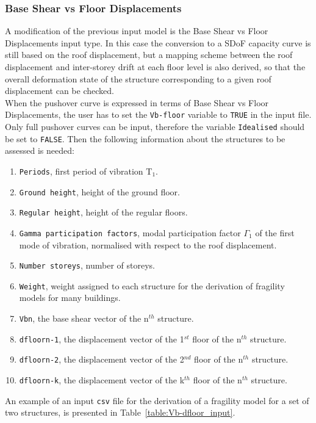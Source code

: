 \subsubsection{Base Shear vs Floor Displacements}
\label{subsubsec:VB-Dfloor}
A modification of the previous input model is the Base Shear vs Floor Displacements input type. In this case the conversion to a SDoF capacity curve is still based on the roof displacement, but a mapping scheme between the roof displacement and inter-storey drift at each floor level is also derived, so that the overall deformation state of the structure corresponding to a given roof displacement can be checked.\\
When the pushover curve is expressed in terms of Base Shear vs Floor Displacements, the user has to set the \verb=Vb-floor= variable to \verb=TRUE= in the input file. Only full pushover curves can be input, therefore the variable \verb=Idealised= should be set to \verb=FALSE=. Then the following information about the structures to be assessed is needed:\\

\begin{enumerate}
\item \verb=Periods=, first period of vibration T$_1$.
\item \verb=Ground height=, height of the ground floor.
\item \verb=Regular height=, height of the regular floors.
\item \verb=Gamma participation factors=, modal participation factor $\Gamma_1$ of the first mode of vibration, normalised with respect to the roof displacement.
\item \verb=Number storeys=, number of storeys.
\item \verb=Weight=, weight assigned to each structure for the derivation of fragility models for many buildings.
\item \verb=Vbn=, the base shear vector of the n$^{th}$ structure.
\item \verb=dfloorn-1=, the displacement vector of the 1$^{st}$ floor of the n$^{th}$ structure.
\item \verb=dfloorn-2=, the displacement vector of the 2$^{nd}$ floor of the n$^{th}$ structure.
\item \verb=dfloorn-k=, the displacement vector of the k$^{th}$ floor of the n$^{th}$ structure. \\
\end{enumerate}

An example of an input \verb=csv= file for the derivation of a fragility model for a set of two structures, is presented in Table~\ref{table:Vb-dfloor_input}.

